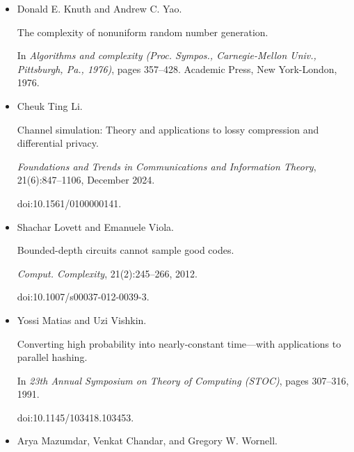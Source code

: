 \documentclass[10pt,a4paper]{article}
\begin{document}
\begin{itemize}
Symmetric distributions from shallow circuits, 2025.


doi:10.48550/arXiv.2511.14127.





\item[] 
[31]

Donald E. Knuth and Andrew C. Yao.


The complexity of nonuniform random number generation.


In \emph{Algorithms and complexity (Proc. Sympos., Carnegie-Mellon
Univ., Pittsburgh, Pa., 1976)}, pages 357–428. Academic Press, New
York-London, 1976.





\item[] 
[32]

Cheuk Ting Li.


Channel simulation: Theory and applications to lossy compression and
differential privacy.


\emph{Foundations and Trends in Communications and Information
Theory}, 21(6):847–1106, December 2024.


doi:10.1561/0100000141.





\item[] 
[33]

Shachar Lovett and Emanuele Viola.


Bounded-depth circuits cannot sample good codes.


\emph{Comput. Complexity}, 21(2):245–266, 2012.


doi:10.1007/s00037-012-0039-3.





\item[] 
[34]

Yossi Matias and Uzi Vishkin.


Converting high probability into nearly-constant time—with
applications to parallel hashing.


In \emph{23th Annual Symposium on Theory of Computing (STOC)}, pages
307–316, 1991.


doi:10.1145/103418.103453.





\item[] 
[35]

Arya Mazumdar, Venkat Chandar, and Gregory W. Wornell.



\end{itemize}
\end{document}
